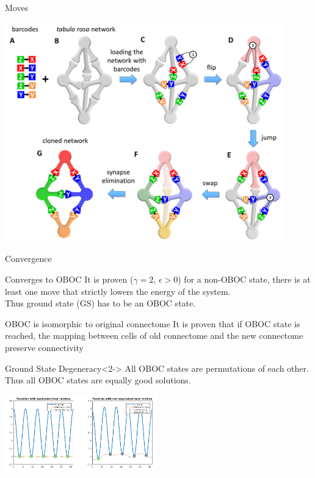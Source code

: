 \documentclass[10pt]{beamer}
\begin{document}
\begin{frame}[fragile]{Moves}
    \begin{center}
        \includegraphics[width=0.9\textwidth]{png/conn_local.png}
    \end{center}
\end{frame}

\begin{frame}[fragile]{Convergence}
    \begin{exampleblock}{Converges to OBOC}
        It is proven ($\gamma=2$, $\epsilon>0$) for a non-OBOC state, there is
        at least one move that strictly lowers the energy of the system. \\
        Thus ground state (GS) has to be an OBOC state.
    \end{exampleblock}
    \begin{exampleblock}{OBOC is isomorphic to original connectome}
        It is proven that if OBOC state is reached, the mapping between cells of
        old connectome and the new connectome preserve connectivity
    \end{exampleblock}
    \begin{alertblock}{\centering Ground State Degeneracy}<2->
        All OBOC states are permutations of each other. \\
        Thus all OBOC states are equally good solutions.
        \begin{center}
            \includegraphics[width=0.5\textwidth]{png/global_local.png}
        \end{center}
    \end{alertblock}
\end{frame}
\end{document}
